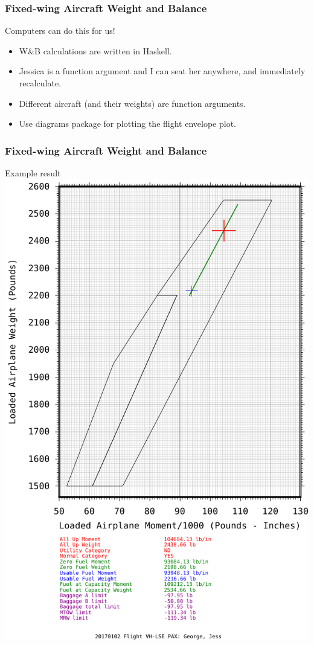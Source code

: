 \begin{frame}
\frametitle{Fixed-wing Aircraft Weight and Balance}
\begin{block}{Computers can do this for us!}
\begin{itemize}
\item<1-> W\&B calculations are written in Haskell.
\item<2-> Jessica is a function argument and I can seat her anywhere, and immediately recalculate.
\item<3-> Different aircraft (and their weights) are function arguments.
\item<4-> Use diagrams package for plotting the flight envelope plot.
\end{itemize}
\end{block}
\end{frame}

\begin{frame}
\frametitle{Fixed-wing Aircraft Weight and Balance}
\begin{block}{Example result}
\includegraphics[height=0.8\textheight]{image/20170102-vhlse.png}
\end{block}
\end{frame}


